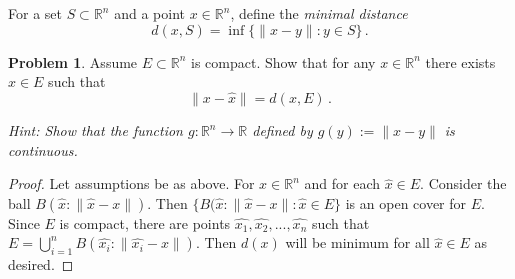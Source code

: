 \documentclass[11pt]{article}
\theoremstyle{definition}
\newtheorem{problem}{Problem}
\newcommand{\R}{\mathbb{R}}
\begin{document}
\pagebreak
For a set $S \subset \R^n$ and a point $x \in \R^n$, define the \emph{minimal distance} 
\[
d(x, S) = \inf\{ \| x - y \| : y \in S\} \,. 
\]
\begin{problem}
Assume $E \subset \R^n$ is compact. Show that for any $x \in \R^n$ there exists $\hat x \in E$ such that
\[
\| x - \hat x\| = d(x, E) \,. 
\]

{\it Hint: Show that the function $g : \R^n \to \R$ defined by $g(y) := \| x - y\|$ is continuous. }
\end{problem}

\begin{proof}
Let assumptions be as above. For $x\in \R^n$ and for each $\hat{x}\in E$. Consider the ball $B(\hat{x}: \|\hat{x}-x\|).$ Then $\{B(\hat{x}: \|\hat{x}-x\|: \hat{x}\in E\}$ is an open cover for $E.$ Since $E$ is compact, there are points $\hat{x_1}, \hat{x_2}, ..., \hat{x_n}$ such that $E = \bigcup_{i = 1}^nB(\hat{x_i}: \|\hat{x_i}-x\|).$ Then $d(x)$ will be minimum for all $\hat{x}\in E$ as desired.
\end{proof}
\end{document}

